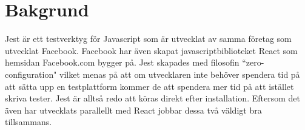 \section{Bakgrund}
\label{sec:david-background}
Jest är ett testverktyg för Javascript som är utvecklat av samma företag som utvecklat Facebook. Facebook  har även skapat javascriptbiblioteket React\cite{bib-react} som hemsidan Facebook.com bygger på. Jest skapades med filosofin ``zero-configuration" vilket menas på att om utvecklaren inte behöver spendera tid på att sätta upp en testplattform kommer de att spendera mer tid på att istället skriva tester. Jest är alltså redo att köras direkt efter installation. Eftersom det även har utvecklats parallellt med React jobbar dessa två väldigt bra tillsammans.

